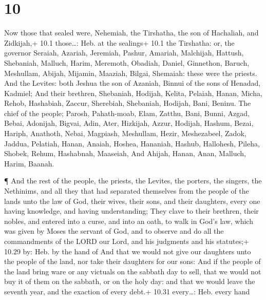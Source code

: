 \hypertarget{section-9}{%
\section{10}\label{section-9}}

 Now those that sealed were, Nehemiah, the Tirshatha, the
son of Hachaliah, and Zidkijah,+ 10.1 those\ldots: Heb. at the sealings+
10.1 the Tirshatha: or, the governor  Seraiah, Azariah,
Jeremiah,  Pashur, Amariah, Malchijah,  Hattush,
Shebaniah, Malluch,  Harim, Meremoth, Obadiah, 
Daniel, Ginnethon, Baruch,  Meshullam, Abijah, Mijamin,
 Maaziah, Bilgai, Shemaiah: these were the priests.
 And the Levites: both Jeshua the son of Azaniah, Binnui of
the sons of Henadad, Kadmiel;  And their brethren,
Shebaniah, Hodijah, Kelita, Pelaiah, Hanan,  Micha, Rehob,
Hashabiah,  Zaccur, Sherebiah, Shebaniah, 
Hodijah, Bani, Beninu.  The chief of the people; Parosh,
Pahath-moab, Elam, Zatthu, Bani,  Bunni, Azgad, Bebai,
 Adonijah, Bigvai, Adin,  Ater, Hizkijah,
Azzur,  Hodijah, Hashum, Bezai,  Hariph,
Anathoth, Nebai,  Magpiash, Meshullam, Hezir, 
Meshezabeel, Zadok, Jaddua,  Pelatiah, Hanan, Anaiah,
 Hoshea, Hananiah, Hashub,  Hallohesh, Pileha,
Shobek,  Rehum, Hashabnah, Maaseiah,  And
Ahijah, Hanan, Anan,  Malluch, Harim, Baanah.

 ¶ And the rest of the people, the priests, the Levites,
the porters, the singers, the Nethinims, and all they that had separated
themselves from the people of the lands unto the law of God, their
wives, their sons, and their daughters, every one having knowledge, and
having understanding;  They clave to their brethren, their
nobles, and entered into a curse, and into an oath, to walk in God's
law, which was given by Moses the servant of God, and to observe and do
all the commandments of the LORD our Lord, and his judgments and his
statutes;+ 10.29 by: Heb. by the hand of  And that we would
not give our daughters unto the people of the land, nor take their
daughters for our sons:  And if the people of the land
bring ware or any victuals on the sabbath day to sell, that we would not
buy it of them on the sabbath, or on the holy day: and that we would
leave the seventh year, and the exaction of every debt.+ 10.31
every\ldots: Heb. every hand

